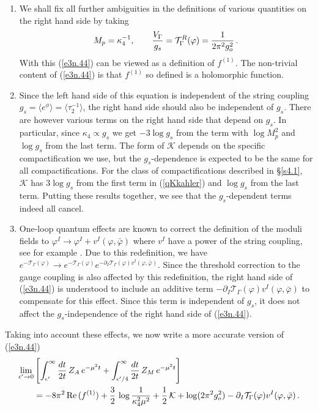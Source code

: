 \documentclass[12pt,a4paper]{article}
\newcommand{\be}{\begin{equation}}
\newcommand{\ee}{\end{equation}}
\newcommand{\refb}[1]{(\ref{#1})}
\newcommand{\p}{\partial}
\def\Re{\,{\rm Re}\,}
\def\[{\left[}
\def\]{\right]}
\newcommand{\eps}{\epsilon}
\newcommand{\vp}{\varphi}
\newcommand{\cK}{\mathcal{K}}
\newcommand{\cT}{\mathcal{T}}
\begin{document}
\begin{enumerate}
\item
We shall fix all further ambiguities in the definitions of various quantities on the right hand
side by taking
\be\label{e424}
M_p=\kappa_4^{-1},
\qquad
{V_\Gamma\over g_s} = \cT^R_\Gamma(\vp) = {1\over 2\pi^2 g_o^2}\, .
\ee
With this \refb{e3n.44} can be viewed as a definition of $f^{(1)}$. The non-trivial content of
\refb{e3n.44} is that $f^{(1)}$ so defined is a holomorphic function.

\item
Since the left hand side of this equation is independent of the string coupling
$g_s=\langle e^\phi\rangle = \langle \tau_2^{-1}\rangle$, the right hand side should
also be independent of $g_s$.
There are however various terms on the right hand side that depend on $g_s$. In particular,
since $\kappa_4\propto g_s$ we get $-3\log g_s$ from the term with $\log M_p^2$ and
$\log g_s$ from the last term. The form of $\cK$ depends on the specific compactification
we use, but the $g_s$-dependence is expected to be the same for all compactifications.
For the class of compactifications described in \S\ref{s4.1}, $\cK$ has $3\log g_s$ from the first
term in \refb{qKkahler} and $\log g_s$ from the last term.
Putting these results together, we see that the $g_s$-dependent terms indeed all cancel.

\item
One-loop quantum effects are known to correct the definition of the
moduli fields to $\vp^I\to\vp^I+ v^I(\vp,\bar\vp)$ where $v^I$ have a power of the string coupling, see for example \cite{Haack:2018ufg}.
Due to this redefinition, we have $e^{-\cT_\Gamma(\vp)}\to e^{-\cT_\Gamma(\vp)} e^{-\p_I\cT_\Gamma(\vp) v^I(\vp,\bar\vp)}$.
Since the threshold correction to the gauge coupling is also affected by this redefinition, the
right hand side of \refb{e3n.44} is understood to include an
additive term $-\p_I\cT_\Gamma(\vp) v^I(\vp,\bar\vp)$ to compensate for this effect.
Since this term is independent of $g_s$, it does not
affect the $g_s$-independence of the right hand side of \refb{e3n.44}.
\end{enumerate}
Taking into account these effects, we now write a more accurate version of \refb{e3n.44}
\be
\label{e3n.44new}
\begin{split}
\lim_{\eps'\to 0} &\[ \int_{\eps'}^{\infty} {dt\over 2t} \,  Z_A \, e^{-\mu^2 t}
+ \int_{\eps'/4}^{\infty} {dt\over 2t} \,  Z_M
\, e^{-\mu^2 t}\]
\\
& = -8\pi^2 \Re(f^{(1)}) +{3\over 2}\, \log{1\over \kappa_4^2\mu^2} +{1\over 2}\, \cK
+\log (2\pi^2 g_o^2)-\p_I \cT_\Gamma(\vp) v^I(\vp,\bar\vp)\, .
\end{split}
\ee
\end{document}
